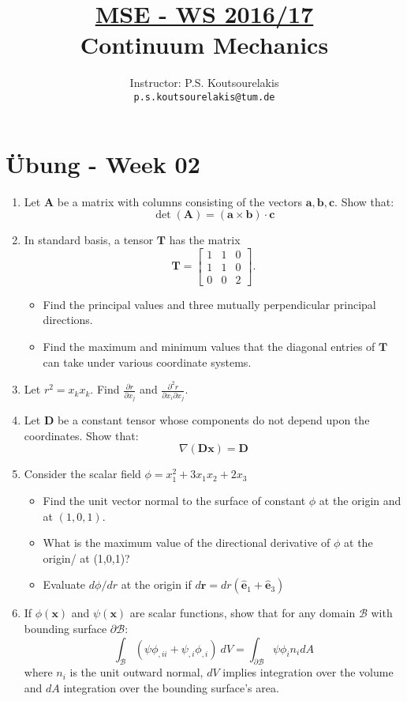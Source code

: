 \documentclass{article}
\title{\underline{MSE - WS 2016/17}\\
Continuum Mechanics}
\author{
Instructor: P.S. Koutsourelakis  \\
\texttt{p.s.koutsourelakis@tum.de} \\
}
\newcommand{\ee}{\end{equation}}
\newcommand{\be}{\begin{equation}}
\newcommand{\bi}{\begin{itemize}}
\newcommand{\ei}{\end{itemize}}
\newcommand{\pa}{\partial}
\newcommand{\bs}{\boldsymbol}
\begin{document}
\makeanontitle

%

\section*{\"Ubung - Week 02}


\begin{enumerate}
\item Let $\bs{A}$ be a matrix with columns consisting of the vectors $\bs a, \bs b, \bs c$. Show that:
\be
\det(\bs{A})=(\bs{a} \times \bs{b}) \cdot \bs{c}
\ee
\item In standard basis, a tensor $\bs{T}$ has the matrix
\be
\bs{T}=\left[\begin{array}{lll}
   1&  1 & 0 \\          1 & 1 & 0 \\ 0 & 0 & 2 
             \end{array}
\right].
\ee
\bi
\item  Find the principal values and three mutually perpendicular principal directions.
\item Find the maximum and minimum values that the diagonal entries of $\bs{T}$ can take under various coordinate
systems.
\ei

\item Let $r^2=x_k x_k$. Find $\frac{\pa r}{\pa x_j}$ and $\frac{\pa^2 r}{\pa x_i \pa x_j}$.

\item  Let $\bs{D}$ be a constant tensor whose components do not depend upon
the coordinates. Show that:
\be
\nabla (\bs{D} \bs{x})=\bs{D}
\ee

\item  Consider the scalar field $\phi=x_1^2+3x_1x_2+2x_3$
\bi
\item  Find the unit vector normal to the surface of constant $\phi$ at the origin and at $(1,0,1)$. 
\item What is the maximum value of the directional derivative of $\phi$ at the origin/ at (1,0,1)? 
\item  Evaluate $d\phi/d r$ at the origin if $d\bs{r}=dr(\bs{\hat{e}}_1+\bs{\hat{e}}_3)$
\ei

\item If $\phi(\bs{x})$ and $\psi(\bs{x})$ are scalar functions, show that for any domain $\mathcal{B}$ with bounding
surface $\pa \mathcal{B}$:
\be
\int_{\mathcal B}( \psi \phi_{,ii}+\psi_{,i}\phi_{,i})~dV=\int_{\pa \mathcal{B}} \psi \phi_i n_i dA
\ee
where $n_i$ is the unit outward normal, $dV$ implies integration over the volume and $dA$ integration over the bounding surface's area.


\end{enumerate}
\end{document}
